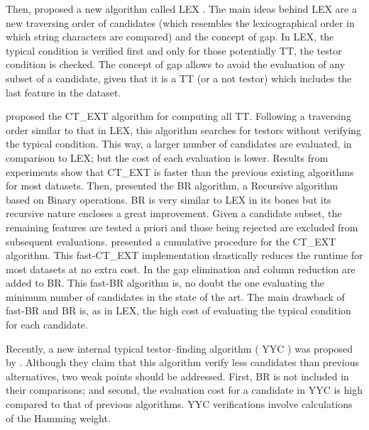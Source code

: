 \documentclass[authoryear,11pt]{elsarticle}
\makeatletter
\newcommand{\setword}[2]{%
  \phantomsection
  #1\def\@currentlabel{\unexpanded{#1}}\label{#2}%
}
\makeatother
\begin{document}
  Then, \cite{Santiesteban03} proposed a new algorithm called \setword{LEX}{LEX}. The main ideas 
  behind LEX are a new traversing order of candidates (which resembles the
  lexicographical order in which string characters are compared) and the concept of gap. In LEX,
  the typical condition is verified first and only for those potentially TT, the testor 
  condition is checked. %
  The concept of gap allows to avoid the evaluation of any subset of a candidate, given that it is
  a TT (or a not testor) which includes the last feature in the dataset.
	
  \cite{Sanchez07} proposed the \setword{CT\_EXT}{CTEXT} algorithm for computing all
  TT. Following a traversing order similar to that in LEX, this algorithm searches for
  testors without verifying the typical condition. This way, a larger number of candidates are 
  evaluated, in comparison to LEX; but the cost of each evaluation is lower. Results from experiments
  show that CT\_EXT is faster than the previous existing algorithms for most datasets. Then, \cite{Lias09}
  presented the \setword{BR}{BR} algorithm, a Recursive algorithm based on 
  Binary operations. BR is very similar to LEX in its bones but its recursive nature encloses a great
  improvement. Given a candidate subset, the remaining features are tested a priori and those being 
  rejected are excluded from subsequent evaluations. \cite{Sanchez10} presented a cumulative
  procedure for the CT\_EXT algorithm. This fast-CT\_EXT implementation drastically reduces the runtime
  for most datasets at no extra cost. In \citep{Lias13} the
  gap elimination and column reduction are added to BR. This fast-BR algorithm is, no doubt the one 
  evaluating the minimum number of candidates in the state of the art. The main drawback of fast-BR and 
  BR is, as in LEX, the high cost of evaluating the typical condition for each candidate. 
 
  Recently, a new internal typical testor--finding algorithm (\setword{YYC}{YYC}) was proposed by \cite{Alba14}. Although 
  they claim that this algorithm verify less candidates than previous alternatives, two weak points should
  be addressed. First, BR is not included in their comparisons; and second, the evaluation cost for a candidate
  in YYC is high compared to that of previous algorithms. YYC verifications involve calculations of the 
  Hamming weight.
\end{document}

